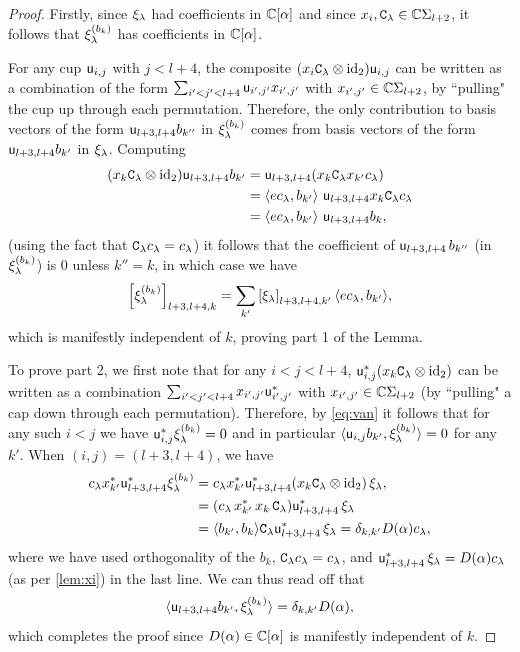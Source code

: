 \begin{proof} 
Firstly, since $\xi_\lambda$ had coefficients in $\mathbb{C}[\alpha]$ and since $x_i, {\mathtt{C}}_\lambda \in \mathbb{C} \Sigma_{l+2}$, it follows that $\xi_\lambda^{(b_k)}$ has coefficients in $\mathbb{C}[\alpha]$. 

For any cup ${\mathsf u}_{i,j}$ with $j<l+4$, the composite $(x_i {\mathtt{C}}_\lambda  \otimes \text{id}_2){\mathsf u}_{i,j}$ can be written as a combination of the form $\sum_{i'<j'<l+4} {\mathsf u}_{i',j'} x_{i',j'}$ with $x_{i',j'}\in \mathbb{C}\Sigma_{l+2}$, by ``pulling" the cup up through each permutation. Therefore, the only contribution to basis vectors of the form  ${\mathsf u}_{l+3,l+4} b_{k''}$ in $\xi_\lambda^{(b_k)}$ comes from basis vectors of the form ${\mathsf u}_{l+3,l+4} b_{k'}$ in $\xi_\lambda$. Computing
\begin{align*}(x_k {\mathtt{C}}_\lambda  \otimes \text{id}_2) {\mathsf u}_{l+3,l+4} b_{k'}&={\mathsf u}_{l+3,l+4}(x_k {\mathtt{C}}_\lambda x_{k'} c_{\lambda})\\
&=\langle e c_\lambda, b_{k'}\rangle \  {\mathsf u}_{l+3,l+4}x_k {\mathtt{C}}_{\lambda} c_{\lambda}\\
&=\langle e c_{\lambda}, b_{k'}\rangle \ {\mathsf u}_{l+3,l+4}b_k,\end{align*}
(using the fact that ${\mathtt{C}}_{\lambda} c_{\lambda}=c_{\lambda}$) it follows that the coefficient of ${\mathsf u}_{l+3,l+4} \, b_{k''}$ (in $\xi_\lambda^{(b_k)}$) is 0 unless $k''=k$, in which case we have
\[ \left[\xi_\lambda^{(b_k)}\right]_{l+3,l+4,k}= \sum_{k'} \left[\xi_\lambda \right]_{l+3,l+4,k'} \langle e c_\lambda ,b_{k'}\rangle,\]
which is manifestly independent of $k$, proving part 1 of the Lemma.

To prove part 2, we first note that for any $i<j<l+4$, ${\mathsf u}_{i,j}^* (x_k {\mathtt{C}}_\lambda\otimes \text{id}_2)$ can be written as a combination $\sum_{i'<j'<l+4} x_{i',j'}{\mathsf u}^*_{i',j'}$ with  $x_{i',j'}\in \mathbb{C} \Sigma_{l+2}$ (by ``pulling" a cap down through each permutation). Therefore, by \eqref{eq:van} it follows that for any such $i<j$ we have ${\mathsf u}_{i,j}^*\xi_{\lambda}^{(b_k)}=0$ and in particular $\langle {\mathsf u}_{i,j} b_{k'}, \xi_{\lambda}^{(b_k)}   \rangle =0$ for any $k'$. When $(i,j)=(l+3,l+4)$, we have
\begin{align*}
    c_{\lambda} x_{k'}^* {\mathsf u}_{l+3,l+4}^* \xi_{\lambda}^{(b_k)}&= 
    c_{\lambda} x_{k'}^* {\mathsf u}_{l+3,l+4}^* (x_k {\mathtt{C}}_\lambda \otimes \text{id}_2) \, \xi_\lambda,\\
    &=(c_\lambda \,  x_{k'}^* \, x_k \, {\mathtt{C}}_\lambda) {\mathsf u}_{l+3,l+4}^* \, \xi_\lambda\\
    &=\langle b_{k'} , b_k\rangle {\mathtt{C}}_\lambda {\mathsf u}_{l+3,l+4}^* \, \xi_\lambda=\delta_{k,k'}D(\alpha) c_\lambda, 
\end{align*}
where we have used orthogonality of the $b_k$, ${\mathtt{C}}_\lambda c_\lambda=c_\lambda$, and ${\mathsf u}_{l+3,l+4}^* \, \xi_\lambda= D(\alpha) c_\lambda$ (as per \ref{lem:xi}) in the last line. We can thus read off that 
\[
\langle {\mathsf u}_{l+3,l+4} b_{k'}, \xi_{\lambda}^{(b_k)}  \rangle =\delta_{k,k'} D(\alpha),
\]
which completes the proof since $D(\alpha)\in \mathbb{C}[\alpha]$ is manifestly independent of $k$. 
\end{proof}

